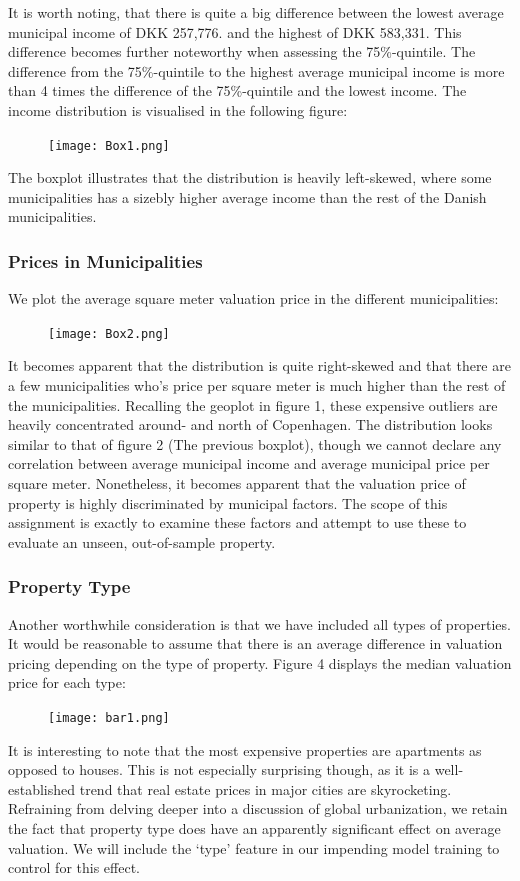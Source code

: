 \documentclass[12pt,a4paper]{article}
\begin{document}
It is worth noting, that there is quite a big difference between the lowest average municipal income of DKK 257,776. and the highest of DKK 583,331. This difference becomes further noteworthy when assessing the 75\%-quintile. The difference from the 75\%-quintile to the highest average municipal income is more than 4 times the difference of the 75\%-quintile and the lowest income. The income distribution is visualised in the following figure:
\begin{figure}[H]
  \centering
   \caption{}
   \texttt{[image: Box1.png]} 
  \label{fig:}
\end{figure}
The boxplot illustrates that the distribution is heavily left-skewed, where some municipalities has a sizebly higher average income than the rest of the Danish municipalities. 

\subsubsection{Prices in Municipalities}
We plot the average square meter valuation price in the different municipalities:
\begin{figure}[H]
  \centering
   \caption{}
   \texttt{[image: Box2.png]} 
  \label{fig:}
\end{figure}
It becomes apparent that the distribution is quite right-skewed and that there are a few municipalities who’s price per square meter is much higher than the rest of the municipalities. Recalling the geoplot in figure 1, these expensive outliers are heavily concentrated around- and north of Copenhagen. 
The distribution looks similar to that of figure 2 (The previous boxplot), though we cannot declare any correlation between average municipal income and average municipal price per square meter. Nonetheless, it becomes apparent that the valuation price of property is highly discriminated by municipal factors. The scope of this assignment is exactly to examine these factors and attempt to use these to evaluate an unseen, out-of-sample property. 

\subsubsection{Property Type}
Another worthwhile consideration is that we have included all types of properties. It would be reasonable to assume that there is an average difference in valuation pricing depending on the type of property. Figure 4 displays the median valuation price for each type:
\begin{figure}[H]
  \centering
   \caption{}
   \texttt{[image: bar1.png]} 
  \label{fig:}
\end{figure}
It is interesting to note that the most expensive properties are apartments as opposed to houses. This is not especially surprising though, as it is a well-established trend that real estate prices in major cities are skyrocketing. Refraining from delving deeper into a discussion of global urbanization, we retain the fact that property type does have an apparently significant effect on average valuation. We will include the ‘type’ feature in our impending model training to control for this effect. 
\end{document}
